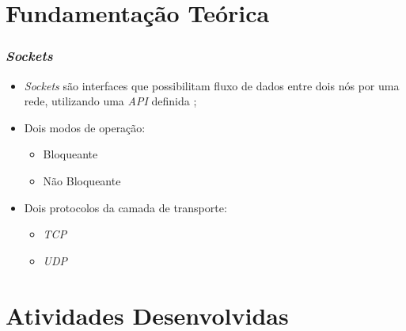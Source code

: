 \documentclass{beamer}
\begin{document}
\section{Fundamentação Teórica}

\begin{frame} \frametitle{\emph{Sockets}}
\begin{itemize}
	\item \justifying \emph{Sockets} são interfaces que possibilitam fluxo de dados entre dois nós por uma rede, utilizando uma \emph{API} definida \cite{Tanenbaum};
	\item Dois modos de operação:
	\begin{itemize}
		\item Bloqueante
		\item Não Bloqueante
	\end{itemize}
	\item \justifying Dois protocolos da camada de transporte:
	\begin{itemize}
		\item \emph{TCP}
		\item \emph{UDP}
	\end{itemize}
\end{itemize}
\end{frame}

\section{Atividades Desenvolvidas}
\end{document}
